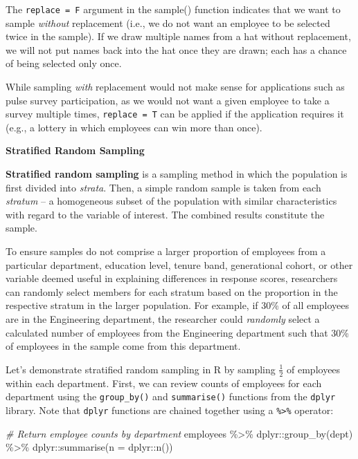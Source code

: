 \documentclass[
]{book}
\newenvironment{Shaded}{\begin{snugshade}}{\end{snugshade}}
\newcommand{\AttributeTok}[1]{\textcolor[rgb]{0.77,0.63,0.00}{#1}}
\newcommand{\CommentTok}[1]{\textcolor[rgb]{0.56,0.35,0.01}{\textit{#1}}}
\newcommand{\FunctionTok}[1]{\textcolor[rgb]{0.00,0.00,0.00}{#1}}
\newcommand{\NormalTok}[1]{#1}
\newcommand{\SpecialCharTok}[1]{\textcolor[rgb]{0.00,0.00,0.00}{#1}}
\begin{document}
The \texttt{replace\ =\ F} argument in the sample() function indicates that we want to sample \emph{without} replacement (i.e., we do not want an employee to be selected twice in the sample). If we draw multiple names from a hat without replacement, we will not put names back into the hat once they are drawn; each has a chance of being selected only once.

While sampling \emph{with} replacement would not make sense for applications such as pulse survey participation, as we would not want a given employee to take a survey multiple times, \texttt{replace\ =\ T} can be applied if the application requires it (e.g., a lottery in which employees can win more than once).

\textbf{Stratified Random Sampling}

\textbf{Stratified random sampling} is a sampling method in which the population is first divided into \emph{strata}. Then, a simple random sample is taken from each \emph{stratum} -- a homogeneous subset of the population with similar characteristics with regard to the variable of interest. The combined results constitute the sample.

To ensure samples do not comprise a larger proportion of employees from a particular department, education level, tenure band, generational cohort, or other variable deemed useful in explaining differences in response scores, researchers can randomly select members for each stratum based on the proportion in the respective stratum in the larger population. For example, if 30\% of all employees are in the Engineering department, the researcher could \emph{randomly} select a calculated number of employees from the Engineering department such that 30\% of employees in the sample come from this department.

Let's demonstrate stratified random sampling in R by sampling \(\frac{1}{2}\) of employees within each department. First, we can review counts of employees for each department using the \texttt{group\_by()} and \texttt{summarise()} functions from the \texttt{dplyr} library. Note that \texttt{dplyr} functions are chained together using a \texttt{\%\textgreater{}\%} operator:

\begin{Shaded}
\begin{Highlighting}[]
\CommentTok{\# Return employee counts by department}
\NormalTok{employees }\SpecialCharTok{\%\textgreater{}\%}
\NormalTok{dplyr}\SpecialCharTok{::}\FunctionTok{group\_by}\NormalTok{(dept) }\SpecialCharTok{\%\textgreater{}\%}
\NormalTok{dplyr}\SpecialCharTok{::}\FunctionTok{summarise}\NormalTok{(}\AttributeTok{n =}\NormalTok{ dplyr}\SpecialCharTok{::}\FunctionTok{n}\NormalTok{())}
\end{Highlighting}
\end{Shaded}
\end{document}
